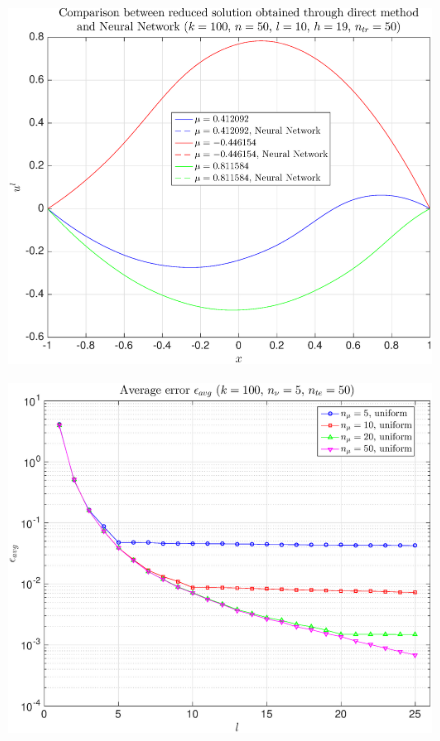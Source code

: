 \documentclass[11pt,a4paper]{article}
\theoremstyle{definition}
\theoremstyle{theorem}
\begin{document}
	\begin{figure}
		\center
		\includegraphics[scale=0.5]{fig17}
		\caption{}
	\end{figure}
	
	\begin{figure}
		\center
		\includegraphics[scale=0.5]{fig18}
		\caption{}
	\end{figure}
	
\end{document}
